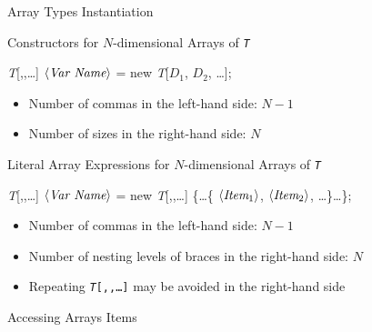 \documentclass[presentation]{beamer}
\newcommand{\cscat}[1]{$\langle\text{{\itshape#1}}\rangle$}
\begin{document}
\begin{frame}[allowframebreaks]{Array Types Instantiation}
    \begin{block}{Constructors for $N$-dimensional Arrays of \texttt{\textit{T}}}
        \begin{center}\ttfamily
            \textit{T}[\alert{,,}\ldots{}] \cscat{Var Name} = \alert{new} \textit{T}[\alert{$D_1$}, \alert{$D_2$}, \ldots];
        \end{center}
        \begin{itemize}
            \item Number of commas in the left-hand side: $N-1$
            \item Number of sizes in the right-hand side: $N$
        \end{itemize}
    \end{block}
    \begin{block}{Literal Array Expressions for $N$-dimensional Arrays of \texttt{\textit{T}}}
        \begin{center}\ttfamily
            \textit{T}[\alert{,,}\ldots{}] \cscat{Var Name} = \alert{new} \textit{T}[\alert{,,}\ldots{}] 
                \alert{\{\ldots\{} \cscat{Item$_1$}, \cscat{Item$_2$}, \ldots  \alert{\}\ldots\}};
        \end{center}
        \begin{itemize}
            \item Number of commas in the left-hand side: $N-1$
            \item Number of nesting levels of braces in the right-hand side: $N$
            \item Repeating \texttt{\textit{T}[\alert{,,}\ldots{}]} may be avoided in the right-hand side
        \end{itemize}
    \end{block}

    \framebreak
    

\end{frame}

\begin{frame}[allowframebreaks]{Accessing Arrays Items}


\end{frame}
\end{document}
